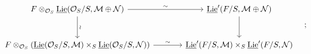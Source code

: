 \[\begin{tikzcd}[column sep=large,row sep=large]
F\otimes_{\mathcal O_S}\underline{\operatorname{Lie}}(\mathcal O_S/S,\mathcal M\oplus\mathcal N) \arrow[r,"\sim"] \arrow[d,"\wr"] & \underline{\operatorname{Lie}}'(F/S,\mathcal M\oplus\mathcal N) \arrow[d]\\
F\otimes_{\mathcal O_S}(\underline{\operatorname{Lie}}(\mathcal O_S/S,\mathcal M)\times_S\underline{\operatorname{Lie}}(\mathcal O_S/S,\mathcal N)) \arrow[r,"\sim"] & \underline{\operatorname{Lie}}'(F/S,\mathcal M)\times_S\underline{\operatorname{Lie}}'(F/S,\mathcal N)
\end{tikzcd}\quad ;\]
